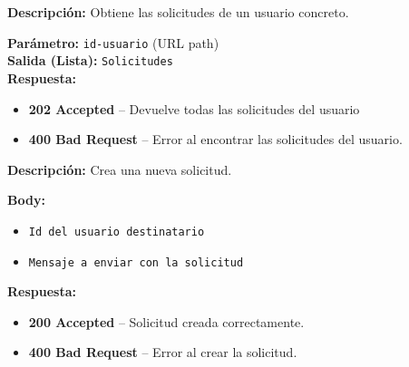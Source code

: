 \begin{tcolorbox}[title=\texttt{GET /usuarios/\{id-usuario\}/solicitudes}, colback=blue!5, colframe=blue!80!black]
\textbf{Descripción:} Obtiene las solicitudes de un usuario concreto.

\textbf{Parámetro:} \texttt{id-usuario} (URL path) \\
\textbf{Salida (Lista):} \texttt{Solicitudes}\\

\textbf{Respuesta:}
\begin{itemize}[label=--]
    \item \textbf{202 Accepted} – Devuelve todas las solicitudes del usuario
    \item \textbf{400 Bad Request} – Error al encontrar las solicitudes del usuario.
\end{itemize}
\end{tcolorbox}
\begin{tcolorbox}[title=\texttt{POST /usuarios/\{id-usuario\}/solicitudes}, colback=blue!5, colframe=blue!80!black]
\textbf{Descripción:} Crea una nueva solicitud.

\textbf{Body:}
\begin{itemize}[label=--]
    \item \texttt{Id del usuario destinatario}
    \item \texttt{Mensaje a enviar con la solicitud}
\end{itemize}

\textbf{Respuesta:}
\begin{itemize}[label=--]
    \item \textbf{200 Accepted} – Solicitud creada correctamente.
    \item \textbf{400 Bad Request} – Error al crear la solicitud.
\end{itemize}
\end{tcolorbox}

